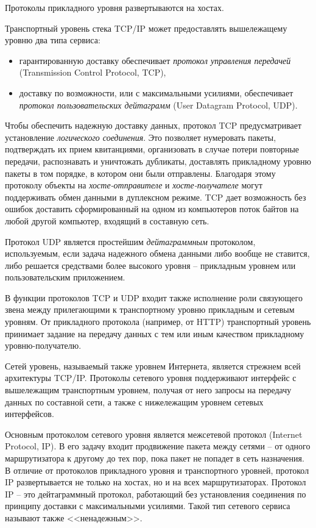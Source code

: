 \documentclass[%
	11pt,
	a4paper,
	utf8,
		]{article}
\begin{document}
Протоколы прикладного уровня развертываются на хостах.

Транспортный уровень стека TCP/IP может предоставлять вышележащему уровню два типа сервиса:

\begin{itemize}
	\item гарантированную доставку обеспечивает \emph{протокол управления передачей} (Transmission Control Protocol, TCP),
	
	\item доставку по возможности, или с максимальными усилиями, обеспечивает \emph{протокол пользовательских дейтаграмм} (User Datagram Protocol, UDP).
\end{itemize}

Чтобы обеспечить надежную доставку данных, протокол TCP предусматривает установление \emph{логического соединения}. Это позволяет нумеровать пакеты, подтверждать их прием квитанциями, организовать в случае потери повторные передачи, распознавать и уничтожать дубликаты, доставлять прикладному уровню пакеты в том порядке, в котором они были отправлены. Благодаря этому протоколу объекты на \emph{хосте-отправителе} и \emph{хосте-получателе} могут поддерживать обмен данными в дуплексном режиме. TCP дает возможность без ошибок доставить сформированный на одном из компьютеров поток байтов на любой другой компьютер, входящий в составную сеть.

Протокол UDP является простейшим \emph{дейтаграммным} протоколом, используемым, если задача надежного обмена данными либо вообще не ставится, либо решается средствами более высокого уровня -- прикладным уровнем или пользовательским приложением.

В функции протоколов TCP и UDP входит также исполнение роли связующего звена между прилегающими к транспортному уровню прикладным и сетевым уровням. От прикладного протокола (например, от HTTP) транспортный уровень принимает задание на передачу данных с тем или иным качеством прикладному уровню-получателю.

Сетей уровень, называемый также уровнем Интернета, является стрежнем всей архитектуры TCP/IP. Протоколы сетевого уровня поддерживают интерфейс с вышележащим транспортным уровнем, получая от него запросы на передачу данных по составной сети, а также с нижележащим уровнем сетевых интерфейсов.

Основным протоколом сетевого уровня является межсетевой протокол (Internet Protocol, IP). В его задачу входит продвижение пакета между сетями -- от одного маршрутизатора к другому до тех пор, пока пакет не попадет в сеть назначения. В отличие от протоколов прикладного уровня и транспортного уровней, протокол IP развертывается не только на хостах, но и на всех маршрутизаторах. Протокол IP -- это дейтаграммный протокол, работающий без установления соединения по принципу доставки с максимальными усилиями. Такой тип сетевого сервиса называют также <<ненадежным>>.
\end{document}
